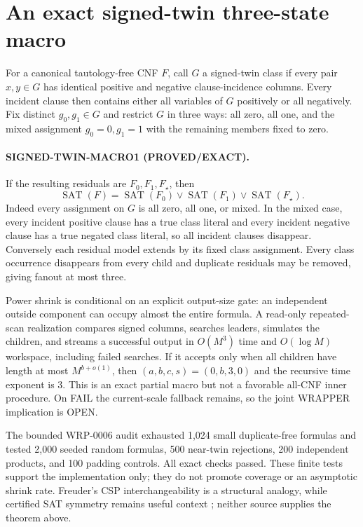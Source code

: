 \section{An exact signed-twin three-state macro}
\label{sec:wrp0006-signed-twin}

For a canonical tautology-free CNF $F$, call $G$ a signed-twin class if every
pair $x,y\in G$ has identical positive and negative clause-incidence columns.
Every incident clause then contains either all variables of $G$ positively or
all negatively.  Fix distinct $g_0,g_1\in G$ and restrict $G$ in three ways:
all zero, all one, and the mixed assignment $g_0=0,g_1=1$ with the remaining
members fixed to zero.

\paragraph{SIGNED-TWIN-MACRO1 (PROVED/EXACT).}
If the resulting residuals are $F_0,F_1,F_\star$, then
\[
 \operatorname{SAT}(F)=
 \operatorname{SAT}(F_0)\lor\operatorname{SAT}(F_1)
 \lor\operatorname{SAT}(F_\star).
\]
Indeed every assignment on $G$ is all zero, all one, or mixed.  In the mixed
case, every incident positive clause has a true class literal and every
incident negative clause has a true negated class literal, so all incident
clauses disappear.  Conversely each residual model extends by its fixed
class assignment.  Every class occurrence disappears from every child and
duplicate residuals may be removed, giving fanout at most three.

Power shrink is conditional on an explicit output-size gate: an independent
outside component can occupy almost the entire formula.  A read-only repeated-
scan realization compares signed columns, searches leaders, simulates the
children, and streams a successful output in $O(M^3)$ time and
$O(\log M)$ workspace, including failed searches.  If it accepts only when
all children have length at most $M^{b+o(1)}$, then
$(a,b,c,s)=(0,b,3,0)$ and the recursive time exponent is $3$.  This is an
exact partial macro but not a favorable all-CNF inner procedure.  On FAIL the
current-scale fallback remains, so the joint WRAPPER implication is OPEN.

The bounded WRP-0006 audit exhausted 1,024 small duplicate-free formulas and
tested 2,000 seeded random formulas, 500 near-twin rejections, 200 independent
products, and 100 padding controls.  All exact checks passed.  These finite
tests support the implementation only; they do not promote coverage or an
asymptotic shrink rate.  Freuder's CSP interchangeability is a structural
analogy, while certified SAT symmetry remains useful context
\cite{wrp0006Freuder,arc0005Orbitopal}; neither source supplies the theorem
above.
